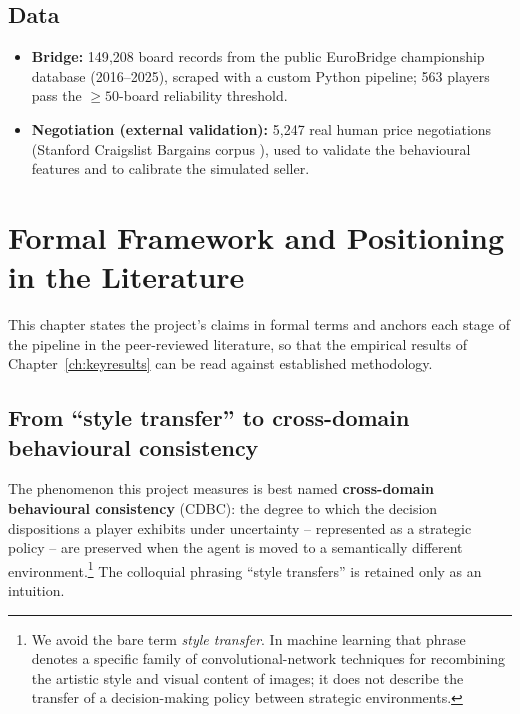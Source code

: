 \documentclass[11pt, a4paper, oneside, openany]{report}
\begin{document}
\section{Data}
\begin{itemize}[leftmargin=*]
  \item \textbf{Bridge:} 149{,}208 board records from the public EuroBridge
        championship database (2016--2025), scraped with a custom Python
        pipeline; 563 players pass the $\geq 50$-board reliability threshold.
  \item \textbf{Negotiation (external validation):} 5{,}247 real human
        price negotiations (Stanford Craigslist Bargains corpus
        \cite{he2018}), used to validate the behavioural features and to
        calibrate the simulated seller.
\end{itemize}

\chapter{Formal Framework and Positioning in the Literature}
\label{ch:formal}

This chapter states the project's claims in formal terms and anchors each stage
of the pipeline in the peer-reviewed literature, so that the empirical results
of Chapter~\ref{ch:keyresults} can be read against established methodology.

\section{From ``style transfer'' to cross-domain behavioural consistency}
The phenomenon this project measures is best named
\textbf{cross-domain behavioural consistency} (CDBC): the degree to which the decision
dispositions a player exhibits under uncertainty -- represented as a strategic
policy -- are preserved when the agent is moved to a semantically different
environment.\footnote{We avoid the bare term \emph{style transfer}.
In machine learning that phrase denotes a specific family of
convolutional-network techniques for recombining the artistic style and visual
content of images; it does not describe the transfer of a decision-making
policy between strategic environments.} The colloquial phrasing ``style
transfers'' is retained only as an intuition.
\end{document}
